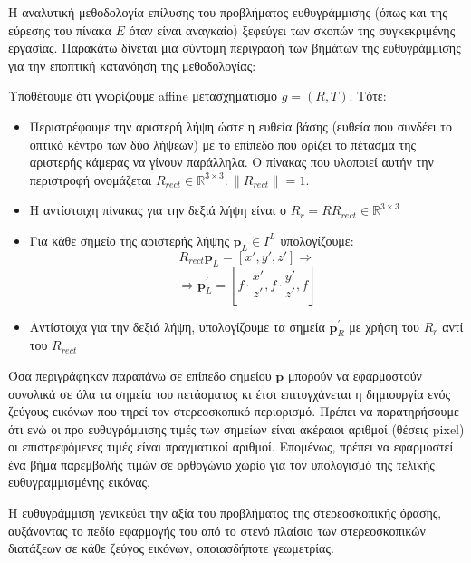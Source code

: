 Η αναλυτική μεθοδολογία επίλυσης του προβλήματος ευθυγράμμισης (όπως και της εύρεσης του πίνακα $E$ όταν είναι αναγκαίο) ξεφεύγει των σκοπών της συγκεκριμένης εργασίας. Παρακάτω δίνεται μια σύντομη περιγραφή των βημάτων της ευθυγράμμισης για την εποπτική κατανόηση της μεθοδολογίας: \citep{trucco1998introductory}

Υποθέτουμε ότι γνωρίζουμε \e affine \g μετασχηματισμό $g = (R,T)$. Τότε:

\begin{itemize}
	\item Περιστρέφουμε την αριστερή λήψη ώστε η ευθεία βάσης (ευθεία που συνδέει το οπτικό κέντρο των δύο λήψεων) με το επίπεδο που ορίζει το πέτασμα της αριστερής κάμερας να γίνουν παράλληλα. Ο πίνακας που υλοποιεί αυτήν την περιστροφή ονομάζεται $R_{rect} \in \mathbb{R}^{3\times 3} : \parallel R_{rect}\parallel = 1$.
	\item Η αντίστοιχη πίνακας για την δεξιά λήψη είναι ο $R_r = RR_{rect} \in \mathbb{R}^{3\times 3}$
	\item Για κάθε σημείο της αριστερής λήψης $\mathbf{p}_L \in I^L$ υπολογίζουμε:
	$$R_{rect}\mathbf{p}_L = [x',y',z'] \Rightarrow$$
	$$\Rightarrow \mathbf{p}_{L}^{'} = [f\cdot \dfrac{x'}{z'},f\cdot \dfrac{y'}{z'},f]$$
	\item Αντίστοιχα για την δεξιά λήψη, υπολογίζουμε τα σημεία $\mathbf{p}_{R}^{'}$ με χρήση του $R_r$ αντί του $R_{rect}$
\end{itemize}

Όσα περιγράφηκαν παραπάνω σε επίπεδο σημείου $\mathbf{p}$ μπορούν να εφαρμοστούν συνολικά σε όλα τα σημεία του πετάσματος κι έτσι επιτυγχάνεται η δημιουργία ενός ζεύγους εικόνων που τηρεί τον στερεοσκοπικό περιορισμό. Πρέπει να παρατηρήσουμε ότι ενώ οι προ ευθυγράμμισης τιμές των σημείων είναι ακέραιοι αριθμοί (θέσεις \e pixel) \g οι επιστρεφόμενες τιμές είναι πραγματικοί αριθμοί. Επομένως, πρέπει να εφαρμοστεί ένα βήμα παρεμβολής τιμών σε ορθογώνιο χωρίο για τον υπολογισμό της τελικής ευθυγραμμισμένης εικόνας.

Η ευθυγράμμιση γενικεύει την αξία του προβλήματος της στερεοσκοπικής όρασης, αυξάνοντας το πεδίο εφαρμογής του από το στενό πλαίσιο των στερεοσκοπικών διατάξεων σε κάθε ζεύγος εικόνων, οποιασδήποτε γεωμετρίας. 

